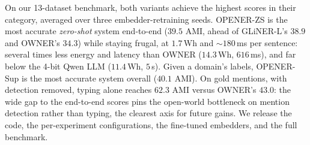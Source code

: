 On our 13-dataset benchmark, both variants achieve the highest scores in their category, averaged over three embedder-retraining seeds. OPENER-ZS is the most accurate \emph{zero-shot} system end-to-end ($39.5$ AMI, ahead of GLiNER-L's $38.9$ and OWNER's $34.3$) while staying frugal, at $1.7$\,Wh and $\sim$$180$\,ms per sentence: several times less energy and latency than OWNER ($14.3$\,Wh, $616$\,ms), and far below the 4-bit Qwen LLM ($11.4$\,Wh, $5$\,s). Given a domain's labels, OPENER-Sup is the most accurate system overall ($40.1$ AMI). On gold mentions, with detection removed, typing alone reaches $62.3$ AMI versus OWNER's $43.0$: the wide gap to the end-to-end scores pins the open-world bottleneck on mention detection rather than typing, the clearest axis for future gains.
We release the code, the per-experiment configurations, the fine-tuned embedders, and the full benchmark.
